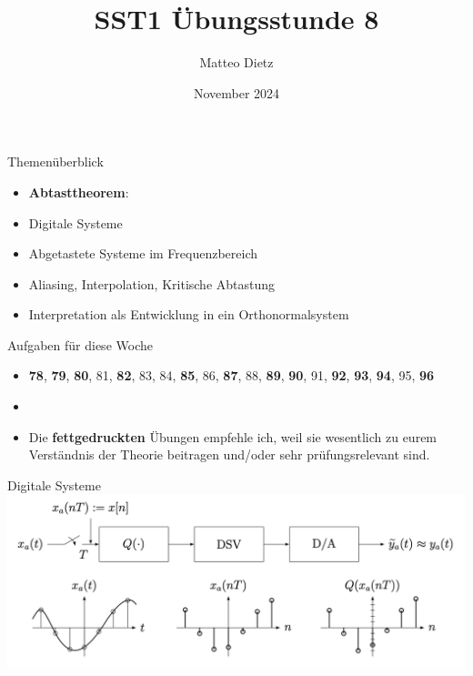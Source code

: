 \documentclass[14pt, aspectratio=169, handout]{beamer}
\title{SST1 Übungsstunde 8}
\author{Matteo Dietz}
\date{November 2024}
\begin{document}
\maketitle

\begin{frame}{Themenüberblick}
    \begin{itemize}
        \item \textbf{Abtasttheorem}:
        \item[] Digitale Systeme
        \item[] Abgetastete Systeme im Frequenzbereich
        \item[] Aliasing, Interpolation, Kritische Abtastung
        \item[] Interpretation als Entwicklung in ein Orthonormalsystem
    \end{itemize}
\end{frame}


\begin{frame}{Aufgaben für diese Woche}
    \begin{itemize}
        \item[] \textbf{78}, \textbf{79}, \textbf{80}, 81, \textbf{82}, 83, 84, \textbf{85}, 86, \textbf{87}, 88, \textbf{89}, \textbf{90}, 91, \textbf{92}, \textbf{93}, \textbf{94}, 95, \textbf{96}
        \item[] 
        \item[] Die \textbf{fettgedruckten} Übungen empfehle ich, weil sie wesentlich zu eurem Verständnis der Theorie beitragen und/oder sehr prüfungsrelevant sind.
    \end{itemize}
\end{frame}

\begin{frame}{Digitale Systeme}
    \includegraphics[width=\linewidth]{figures/digitale_sys1.png}
\end{frame}
\end{document}
